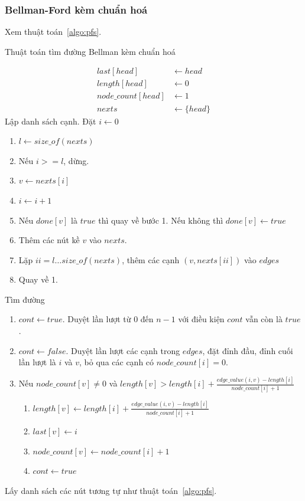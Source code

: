 \documentclass[a4paper,oneside,14pt]{extbook} %
\begin{document}
\subsubsection{Bellman-Ford kèm chuẩn hoá}

Xem thuật toán~\ref{algo:pfs}.

\begin{algo}
  \caption{Thuật toán tìm đường Bellman kèm chuẩn hoá}
  \label{algo:pfs}
  \begin{align*}
    last[head] &\leftarrow head\\
    length[head] &\leftarrow 0\\
    node\_count[head] &\leftarrow 1\\
    nexts &\leftarrow \{head\}
  \end{align*}
Lập danh sách cạnh. Đặt $i \leftarrow 0$
  \begin{enumerate}
  \item $l \leftarrow size\_of(nexts)$
  \item Nếu $i >= l$, dừng.
  \item $v \leftarrow nexts[i]$
  \item $i \leftarrow i+1$
  \item Nếu $done[v]$ là $true$ thì quay về bước 1. Nếu không thì
    $done[v] \leftarrow true$
  \item Thêm các nút kề $v$ vào $nexts$.
  \item Lặp $ii = l\ldots size\_of(nexts)$, thêm các cạnh
    $(v,nexts[ii])$ vào $edges$
  \item Quay về 1.
  \end{enumerate}
Tìm đường
\begin{enumerate}
\item $cont \leftarrow true$. Duyệt lần lượt từ $0$ đến $n-1$ với điều kiện
  $cont$ vẫn còn là $true$.
\item $cont \leftarrow false$. Duyệt lần lượt các cạnh trong $edges$, đặt đỉnh đầu, đỉnh cuối
  lần lượt là $i$ và $v$, bỏ qua các cạnh có $node\_count[i] = 0$.
\item Nếu $node\_count[v] \ne 0$ và $length[v] > length[i] +
  \frac{edge\_value(i,v)-length[i]}{node\_count[i]+1}$
  \begin{enumerate}
  \item $length[v] \leftarrow length[i] +
    \frac{edge\_value(i,v)-length[i]}{node\_count[i]+1}$
  \item $last[v] \leftarrow i$
  \item $node\_count[v] \leftarrow node\_count[i]+1$
  \item $cont \leftarrow true$
  \end{enumerate}
\end{enumerate}
Lấy danh sách các nút tương tự như thuật toán~\ref{algo:pfs}.
\end{algo}
\end{document}
